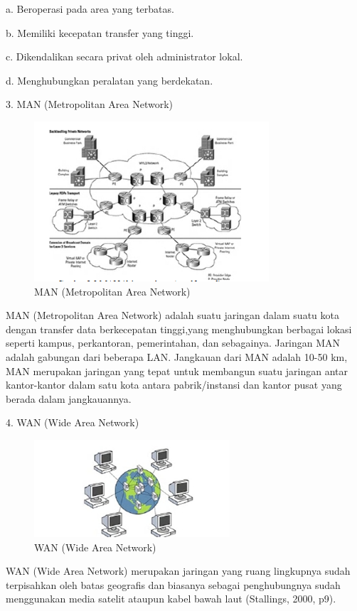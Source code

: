 \documentclass{jtetiproposalskripsi}
\begin{document}
a. Beroperasi pada area yang terbatas.

b. Memiliki kecepatan transfer yang tinggi.

c. Dikendalikan secara privat oleh administrator lokal.

d. Menghubungkan peralatan yang berdekatan.

3. MAN (Metropolitan Area Network)

\begin{figure}[ht!]
  \centering
    \includegraphics{gambar/man}
    \caption{MAN (Metropolitan Area Network)}
    \label{kripto}
\end{figure}
	
	MAN (Metropolitan Area Network) adalah suatu jaringan dalam suatu kota dengan transfer data berkecepatan tinggi,yang
menghubungkan berbagai lokasi seperti kampus, perkantoran, pemerintahan, dan sebagainya. Jaringan MAN adalah gabungan dari 
beberapa LAN. Jangkauan dari MAN adalah 10-50 km, MAN merupakan jaringan yang tepat untuk membangun suatu jaringan antar kantor-kantor dalam satu kota antara pabrik/instansi dan kantor pusat yang berada dalam jangkauannya.

4. WAN (Wide Area Network)
	
\begin{figure}[ht!]
  \centering
    \includegraphics{gambar/wan}
    \caption{WAN (Wide Area Network)}
    \label{kripto}
\end{figure}
	
	WAN (Wide Area Network) merupakan jaringan yang ruang lingkupnya sudah terpisahkan oleh batas geografis dan biasanya sebagai penghubungnya sudah menggunakan media satelit ataupun kabel bawah laut (Stallings, 2000, p9).
\end{document}
